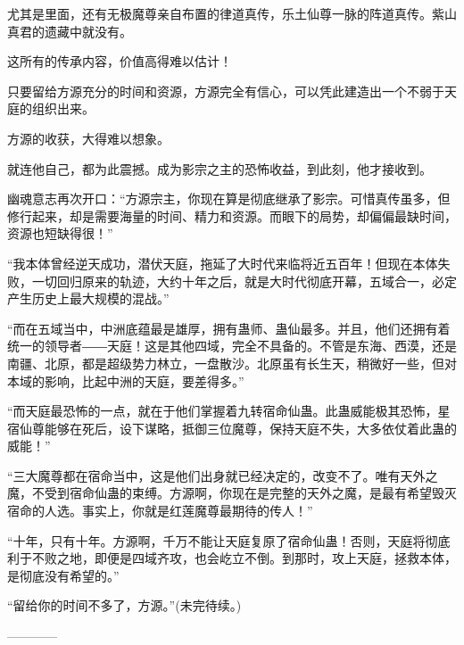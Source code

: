 \begin{this_body}
尤其是里面，还有无极魔尊亲自布置的律道真传，乐土仙尊一脉的阵道真传。紫山真君的遗藏中就没有。

这所有的传承内容，价值高得难以估计！

只要留给方源充分的时间和资源，方源完全有信心，可以凭此建造出一个不弱于天庭的组织出来。

方源的收获，大得难以想象。

就连他自己，都为此震撼。成为影宗之主的恐怖收益，到此刻，他才接收到。

幽魂意志再次开口：“方源宗主，你现在算是彻底继承了影宗。可惜真传虽多，但修行起来，却是需要海量的时间、精力和资源。而眼下的局势，却偏偏最缺时间，资源也短缺得很！”

“我本体曾经逆天成功，潜伏天庭，拖延了大时代来临将近五百年！但现在本体失败，一切回归原来的轨迹，大约十年之后，就是大时代彻底开幕，五域合一，必定产生历史上最大规模的混战。”

“而在五域当中，中洲底蕴最是雄厚，拥有蛊师、蛊仙最多。并且，他们还拥有着统一的领导者――天庭！这是其他四域，完全不具备的。不管是东海、西漠，还是南疆、北原，都是超级势力林立，一盘散沙。北原虽有长生天，稍微好一些，但对本域的影响，比起中洲的天庭，要差得多。”

“而天庭最恐怖的一点，就在于他们掌握着九转宿命仙蛊。此蛊威能极其恐怖，星宿仙尊能够在死后，设下谋略，抵御三位魔尊，保持天庭不失，大多依仗着此蛊的威能！”

“三大魔尊都在宿命当中，这是他们出身就已经决定的，改变不了。唯有天外之魔，不受到宿命仙蛊的束缚。方源啊，你现在是完整的天外之魔，是最有希望毁灭宿命的人选。事实上，你就是红莲魔尊最期待的传人！”

“十年，只有十年。方源啊，千万不能让天庭复原了宿命仙蛊！否则，天庭将彻底利于不败之地，即便是四域齐攻，也会屹立不倒。到那时，攻上天庭，拯救本体，是彻底没有希望的。”

“留给你的时间不多了，方源。”(未完待续。)

------------

\end{this_body}

